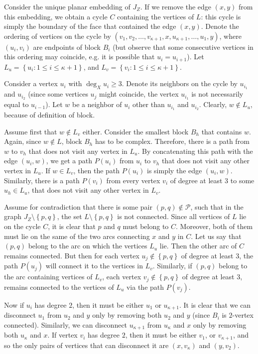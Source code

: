 \documentclass[twoside,leqno,twocolumn]{article}
\newcommand{\set}[1]{\left\{ #1 \right\}}
\newcommand{\pset}{{\mathcal{P}}}
\begin{document}
Consider the unique planar embedding of $J_Z$. If we remove the edge $(x,y)$ from this embedding, we obtain a cycle $C$ containing the vertices of $L$: this cycle is simply the boundary of the face that contained the edge $(x,y)$.
Denote the ordering of vertices on the cycle by $(v_1,v_2,\ldots,v_{\kappa+1},x,u_{\kappa+1},\ldots,u_1,y)$, where $(u_i,v_i)$ are endpoints of block $B_i$ (but observe that some consecutive vertices in this ordering may coincide, e.g. it is possible that $u_i=u_{i+1}$).
Let $L_u=\set{u_i: 1\leq i\leq \kappa+1}$, and $L_v=\set{v_i: 1\leq i\leq \kappa+1}$.

Consider a vertex $u_i$ with $\deg_X u_i \geq 3$. Denote its neighbors on the cycle
by $u_{i_1}$ and $u_{i_2}$ (since some vertices $u_j$ might coincide, the vertex
$u_{i_1}$ is not necessarily equal to $u_{i-1}$).
Let $w$ be a neighbor of $u_i$ other than $u_{i_1}$ and $u_{i_2}$. Clearly,
$w\notin L_u$, because of definition of block. 

Assume first that $w\notin L_v$ either.
Consider the smallest block $B_h$ that contains $w$.
Again, since $w\not\in L$, block $B_h$ has to be complex. Therefore, there is a path from $w$ to $v_h$ that 
does not visit any vertex in $L_u$. By concatenating this path with the edge $(u_i,w)$, 
we get a path $P(u_i)$ from $u_i$ to $v_h$  that does not visit any other vertex in $L_u$. If $w\in L_v$, then the path $P(u_i)$ is simply the edge $(u_i,w)$.
Similarly, there is a path $P(v_i)$ from every vertex $v_i$ of degree at least $3$ 
to some $u_h\in L_u$, that does not visit any other vertex in $L_v$. 

Assume for contradiction that there is some pair $(p,q)\not\in \pset$, such that in the graph $J_Z\setminus\set{p,q}$, the set $L\setminus\set{p,q}$ is not connected. Since all vertices of $L$ lie on the cycle $C$, it is clear that $p$ and $q$ must belong to $C$.
Moreover, both of them must lie on the same of the two arcs connecting $x$ and $y$ in $C$.
Let us say that $(p,q)$ belong to the arc on which the vertices $L_u$ lie.
Then the other arc of $C$ remains connected. But then for each vertex $u_j\not\in\set{p,q}$ of degree at least $3$, the path $P(u_j)$ will connect it to the vertices in $L_v$. Similarly, if $(p,q)$ belong to the arc containing vertices of $L_v$, each vertex $v_j\not\in\set{p,q}$ of degree at least $3$, remains connected to the vertices of $L_u$ via the path $P(v_j)$.
 
 Now if $u_i$ has degree $2$, then it must be either $u_1$ or $u_{\kappa+1}$.
It is clear that we can disconnect $u_1$ from $u_2$ and $y$
only by removing both $u_2$ and $y$ (since $B_i$ is $2$-vertex connected). Similarly, we can disconnect
$u_{\kappa+1}$ from $u_{\kappa}$ and $x$ only by removing both $u_{\kappa}$ and $x$. If vertex $v_i$ has degree $2$, then it must be either $v_1$, or $v_{\kappa+1}$, and so the only pairs of vertices that can disconnect it are $(x,v_{\kappa})$ and $(y,v_2)$.
\fi
\end{document}
